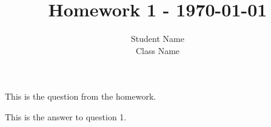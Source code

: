 \documentclass[12pt]{article}
\newenvironment{question}[2][Question]{\begin{trivlist}
\item[\hskip \labelsep {\bfseries #1}\hskip \labelsep {\bfseries #2.}]}{\end{trivlist}}
\newenvironment{answer}[2][Answer]{\begin{trivlist}
\item[\hskip \labelsep {\bfseries #1}\hskip \labelsep {\bfseries #2.}]}{\end{trivlist}}
\begin{document}
 
 
\title{Homework 1 - \today}
\author{Student Name\\ 
Class Name} 
 
\maketitle
 
\begin{question}{1}
This is the question from the homework.
\end{question}

\begin{answer}{1}
This is the answer to question 1.

\end{answer}


\end{document}
